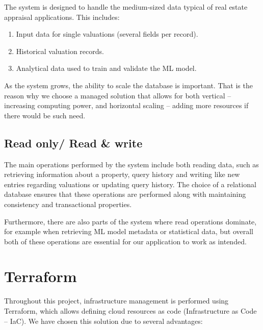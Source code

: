 \documentclass{article}
\begin{document}
The system is designed to handle the medium-sized data typical of real estate appraisal applications. This includes:

\begin{enumerate}
    \item Input data for single valuations (several fields per record).
    \item Historical valuation records.
    \item Analytical data used to train and validate the ML model.
\end{enumerate}

As the system grows, the ability to scale the database is important. That is the reason why we choose a managed solution that allows for both vertical  -- increasing computing power, and horizontal scaling -- adding more resources if there would be such need.


\subsection{Read only/ Read \& write}

The main operations performed by the system include both reading data, such as retrieving information about a property, query history and writing like new entries regarding valuations or updating query history. The choice of a relational database ensures that these operations are performed along with maintaining consistency and transactional properties.

Furthermore, there are also parts of the system where read operations dominate, for example when retrieving ML model metadata or statistical data, but overall both of these operations are essential for our application to work as intended. 


\section{Terraform}

Throughout this project, infrastructure management is performed using Terraform, which allows defining cloud resources as code (Infrastructure as Code – IaC). We have chosen this solution due to several advantages:
\end{document}
